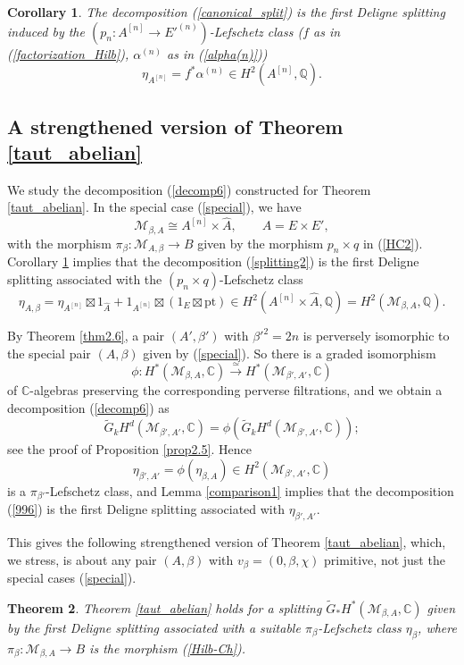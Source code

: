 \documentclass[11pt]{amsart}
\theoremstyle{plain}
\newtheorem{thm}{Theorem}[section]
\newtheorem{cor}[thm]{Corollary}
\theoremstyle{definition}
\theoremstyle{remark}
\newcommand{\BC}{{\mathbb{C}}}
\newcommand{\BQ}{{\mathbb{Q}}}
\newcommand{\CM}{{\mathcal M}}
\begin{document}
\begin{cor}\label{cor3.6}
The decomposition (\ref{canonical_split}) is the first Deligne splitting induced by the 
$(p_n: A^{[n]} \to E'^{(n)})$-Lefschetz class  ($f$ as in (\ref{factorization_Hilb}), $\alpha^{(n)}$
as in (\ref{alpha(n)}))
\[
\eta_{A^{[n]}} = f^*\alpha^{(n)} \in H^2(A^{[n]}, \BQ).
\]
\end{cor}

\subsection{A strengthened version of Theorem \ref{taut_abelian}}\label{Section3.5}
We study the decomposition (\ref{decomp6}) constructed for Theorem \ref{taut_abelian}. In the special case (\ref{special}), we have
\[
\CM_{\beta, A} \cong A^{[n]} \times \hat{A}, \qquad A=E \times E',
\]
with the morphism $\pi_\beta: \CM_{A,\beta} \to B$ given by the morphism $p_n\times q$ in (\ref{HC2}). Corollary \ref{cor3.6} 
implies that the decomposition (\ref{splitting2}) is the first Deligne splitting associated with the 
$(p_n\times q)$-Lefschetz class 
\[
\eta_{A,\beta} = \eta_{A^{[n]}} \boxtimes 1_{\hat{A}} + 1_{A^{[n]}}\boxtimes \left(1_E \boxtimes \mathrm{pt} \right) \in H^2(A^{[n]} \times \hat{A}, \BQ) =  H^2(\CM_{\beta, A}, \BQ).
\]

By Theorem \ref{thm2.6}, a pair $(A', \beta')$ with $\beta'^2=2n$ is perversely isomorphic to the special pair $(A, \beta)$ given by (\ref{special}). So there is a graded isomorphism
\[
\phi: H^*(\CM_{\beta, A}, \BC) \xrightarrow{\simeq} H^*(\CM_{\beta', A'}, \BC) 
\]
of $\BC$-algebras preserving the corresponding perverse filtrations, and we obtain a decomposition (\ref{decomp6}) as
\begin{equation}\label{996}
\widetilde{G}_kH^d(\CM_{\beta',A'}, \BC) = \phi(\widetilde{G}_kH^d(\CM_{\beta',A'}, \BC));
\end{equation}
see the proof of Proposition \ref{prop2.5}. Hence
\[
\eta_{\beta',A'} = \phi(\eta_{\beta,A}) \in H^2(\CM_{\beta',A'}, \BC)
\]
is a $\pi_{\beta'}$-Lefschetz class, and Lemma \ref{comparison1} implies that the decomposition (\ref{996}) is the first Deligne splitting associated with $\eta_{\beta',A'}$. 

This gives the following strengthened version of Theorem \ref{taut_abelian}, which, we stress, is about any pair $(A,  \beta)$ with $v_\beta = (0, \beta, \chi)$ primitive, not just the special cases (\ref{special}).

\begin{thm}\label{strengthened2.1}
Theorem \ref{taut_abelian} holds for a splitting $\widetilde{G}_\ast H^\ast(\CM_{\beta,A}, \BC)$ given by the first Deligne splitting associated with a {suitable $\pi_\beta$-Lefschetz class $\eta_\beta$}, where $\pi_\beta: \CM_{\beta,A} \to B$  is the morphism (\ref{Hilb-Ch}).
\end{thm}
\end{document}
